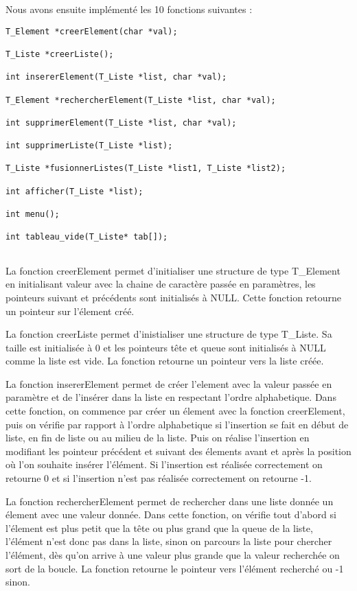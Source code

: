 \documentclass[11pt]{report}
\begin{document}
Nous avons ensuite implémenté les 10 fonctions suivantes : 
\begin{lstlisting}
T_Element *creerElement(char *val);

T_Liste *creerListe();

int insererElement(T_Liste *list, char *val);

T_Element *rechercherElement(T_Liste *list, char *val);

int supprimerElement(T_Liste *list, char *val);

int supprimerListe(T_Liste *list);

T_Liste *fusionnerListes(T_Liste *list1, T_Liste *list2);

int afficher(T_Liste *list);

int menu();

int tableau_vide(T_Liste* tab[]); 
 
\end{lstlisting}

La fonction creerElement permet d'initialiser une structure de type T\_Element en initialisant valeur avec la chaine de caractère passée en paramètres, les pointeurs suivant et précédents sont initialisés à NULL. Cette fonction retourne un pointeur sur l'élement créé.

\medskip

La fonction creerListe permet d'inistialiser une structure de type T\_Liste. Sa taille est initialisée à 0 et les pointeurs tête et queue sont initialisés à NULL comme la liste est vide. La fonction retourne un pointeur vers la liste créée. 

\medskip

La fonction insererElement permet de créer l'element avec la valeur passée en paramètre et de l'insérer dans la liste en respectant l'ordre alphabetique. Dans cette fonction, on commence par créer un élement avec la fonction creerElement, puis on vérifie par rapport à l'ordre alphabetique si l'insertion se fait en début de liste, en fin de liste ou au milieu de la liste. Puis on réalise l'insertion en modifiant les pointeur précédent et suivant des élements avant et après la position où l'on souhaite insérer l'élément. 
Si l'insertion est réalisée correctement on retourne 0 et si l'insertion n'est pas réalisée correctement on retourne -1.

\medskip

La fonction rechercherElement permet de rechercher dans une liste donnée un élement avec une valeur donnée. Dans cette fonction, on vérifie tout d'abord si l'élement est plus petit que la tête ou plus grand que la queue de la liste, l'élément n'est donc pas dans la liste, sinon on parcours la liste pour chercher l'élément, dès qu'on arrive à une valeur plus grande que la valeur recherchée on sort de la boucle. La fonction retourne le pointeur vers l'élément recherché ou -1 sinon. 
\end{document}
